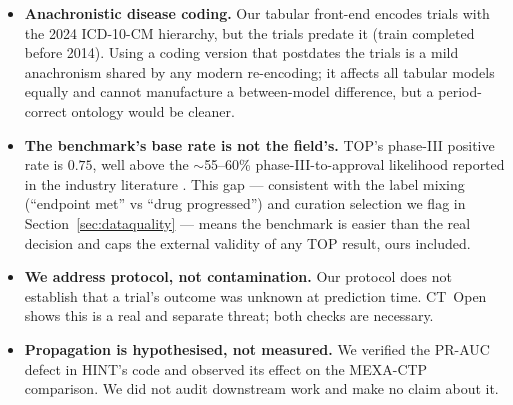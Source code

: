 \documentclass[a4paper,fleqn]{cas-sc}
\begin{document}
\begin{itemize}
        (Table~\ref{tab:splits}), so validation-selected thresholds underperform test-oracle
        thresholds. The protocol is correct; the shift should be reported.
  \item \textbf{Anachronistic disease coding.} Our tabular front-end encodes trials with the
        2024 ICD-10-CM hierarchy, but the trials predate it (train completed before 2014). Using a
        coding version that postdates the trials is a mild anachronism shared by any modern
        re-encoding; it affects all tabular models equally and cannot manufacture a between-model
        difference, but a period-correct ontology would be cleaner.
  \item \textbf{The benchmark's base rate is not the field's.} TOP's phase-III positive rate is
        $0.75$, well above the $\sim$55--60\% phase-III-to-approval likelihood reported in the
        industry literature \citep{hay2014clinical,wong2019estimation}. This gap --- consistent with
        the label mixing (``endpoint met'' vs ``drug progressed'') and curation selection we flag in
        Section~\ref{sec:dataquality} --- means the benchmark is easier than the real decision and
        caps the external validity of any TOP result, ours included.
  \item \textbf{We address protocol, not contamination.} Our protocol does not establish that
        a trial's outcome was unknown at prediction time. CT~Open \citep{wang2025ctopen} shows
        this is a real and separate threat; both checks are necessary.
  \item \textbf{Propagation is hypothesised, not measured.} We verified the PR-AUC defect in
        HINT's code and observed its effect on the MEXA-CTP comparison. We did not audit
        downstream work and make no claim about it.
\end{itemize}
\end{document}
